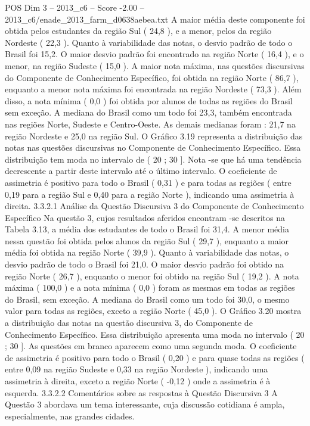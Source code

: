 \begin{textsample}{POS Dim 3 – 2013\_c6 – Score -2.00 – 2013\_c6/enade\_2013\_farm\_d0638aebea.txt}
A maior média deste componente foi obtida pelos estudantes da região Sul ( 24,8 ), e a menor, pelos da região Nordeste ( 22,3 ).
Quanto à variabilidade das notas, o desvio padrão de todo o Brasil foi 15,2.
O maior desvio padrão foi encontrado na região Norte ( 16,4 ), e o menor, na região Sudeste ( 15,0 ).
A maior nota máxima, nas questões discursivas do Componente de Conhecimento Específico, foi obtida na região Norte ( 86,7 ), enquanto a menor nota máxima foi encontrada na região Nordeste ( 73,3 ).
Além disso, a nota mínima ( 0,0 ) foi obtida por alunos de todas as regiões do Brasil sem exceção.
A mediana do Brasil como um todo foi 23,3, também encontrada nas regiões Norte, Sudeste e Centro-Oeste.
As demais medianas foram : 21,7 na região Nordeste e 25,0 na região Sul.
O Gráfico 3.19 representa a distribuição das notas nas questões discursivas no Componente de Conhecimento Específico.
Essa distribuição tem moda no intervalo de ( 20 ; 30 ].
Nota -se que há uma tendência decrescente a partir deste intervalo até o último intervalo.
O coeficiente de assimetria é positivo para todo o Brasil ( 0,31 ) e para todas as regiões ( entre 0,19 para a região Sul e 0,40 para a região Norte ), indicando uma assimetria à direita. 3.3.2.1 Análise da Questão Discursiva 3 do Componente de Conhecimento Específico Na questão 3, cujos resultados aferidos encontram -se descritos na Tabela 3.13, a média dos estudantes de todo o Brasil foi 31,4.
A menor média nessa questão foi obtida pelos alunos da região Sul ( 29,7 ), enquanto a maior média foi obtida na região Norte ( 39,9 ).
Quanto à variabilidade das notas, o desvio padrão de todo o Brasil foi 21,0.
O maior desvio padrão foi obtido na região Norte ( 26,7 ), enquanto o menor foi obtido na região Sul ( 19,2 ).
A nota máxima ( 100,0 ) e a nota mínima ( 0,0 ) foram as mesmas em todas as regiões do Brasil, sem exceção.
A mediana do Brasil como um todo foi 30,0, o mesmo valor para todas as regiões, exceto a região Norte ( 45,0 ).
O Gráfico 3.20 mostra a distribuição das notas na questão discursiva 3, do Componente de Conhecimento Específico.
Essa distribuição apresenta uma moda no intervalo ( 20 ; 30 ].
As questões em branco aparecem como uma segunda moda.
O coeficiente de assimetria é positivo para todo o Brasil ( 0,20 ) e para quase todas as regiões ( entre 0,09 na região Sudeste e 0,33 na região Nordeste ), indicando uma assimetria à direita, exceto a região Norte ( -0,12 ) onde a assimetria é à esquerda. 3.3.2.2 Comentários sobre as respostas à Questão Discursiva 3 A Questão 3 abordava um tema interessante, cuja discussão cotidiana é ampla, especialmente, nas grandes cidades.

\end{textsample}
